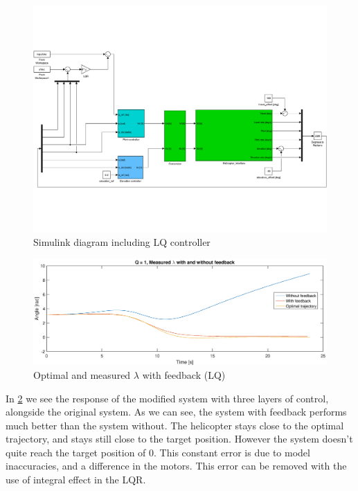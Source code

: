 \begin{figure}
    \includegraphics[width=\textwidth]{ex3sim.pdf}
    \caption{Simulink diagram including LQ controller}
    \label{fig:simulink_LQ}
\end{figure}

\begin{figure}[h]
    \includegraphics[width=\textwidth]{ex3_with_vs_without_feedback.eps}
    \caption{Optimal and measured $\lambda$ with feedback (LQ)}
    \label{fig:opt_meas_lambda_ex3}
\end{figure}

In \cref{fig:opt_meas_lambda_ex3} we see the response of the modified system with three layers of control, alongside the original system. As we can see, the system with feedback performs much better than the system without. The helicopter stays close to the optimal trajectory, and stays still close to the target position. However the system doesn't quite reach the target position of 0. This constant error is due to model inaccuracies, and a difference in the motors. This error can be removed with the use of integral effect in the LQR.

